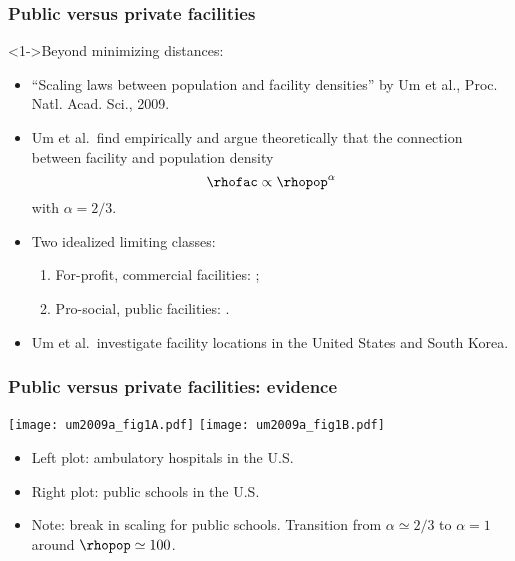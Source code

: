 \begin{frame}
  \frametitle{Public versus private facilities}

  \begin{block}<1->{Beyond minimizing distances:}
    \begin{itemize}
    \item<2->
      ``Scaling laws between population and facility densities'' by
      Um et al., Proc. Natl. Acad. Sci., 2009.\cite{um2009a}
    \item<3->
      Um et al.\ find empirically and argue theoretically that the connection
      between facility and population density
      $$
      \rhofac \propto \rhopop^{\alpha}
      $$
       with $\alpha=2/3$.
    \item<4->
      \alert{Two idealized limiting classes}:
      \begin{enumerate}
      \item<4->
        For-profit, commercial facilities: ;
      \item<5->
        Pro-social, public facilities: .
      \end{enumerate}
    \item<5->
      Um et al.\ investigate facility locations in the United States
      and South Korea.
    \end{itemize}
  \end{block}
  
\end{frame}


\begin{frame}
  \frametitle{Public versus private facilities: evidence}

  \texttt{[image: um2009a\_fig1A.pdf]}
  \texttt{[image: um2009a\_fig1B.pdf]}

  \begin{itemize}
  \item<1->
    \alert{Left plot:} ambulatory hospitals in the U.S.
  \item<1-> 
    \alert{Right plot:} public schools in the U.S.
  \item<2->
    Note: break in scaling for public schools.
    Transition from $\alpha \simeq 2/3$ to 
    $\alpha = 1$ around $\rhopop \simeq 100$.
  \end{itemize}

\end{frame}

